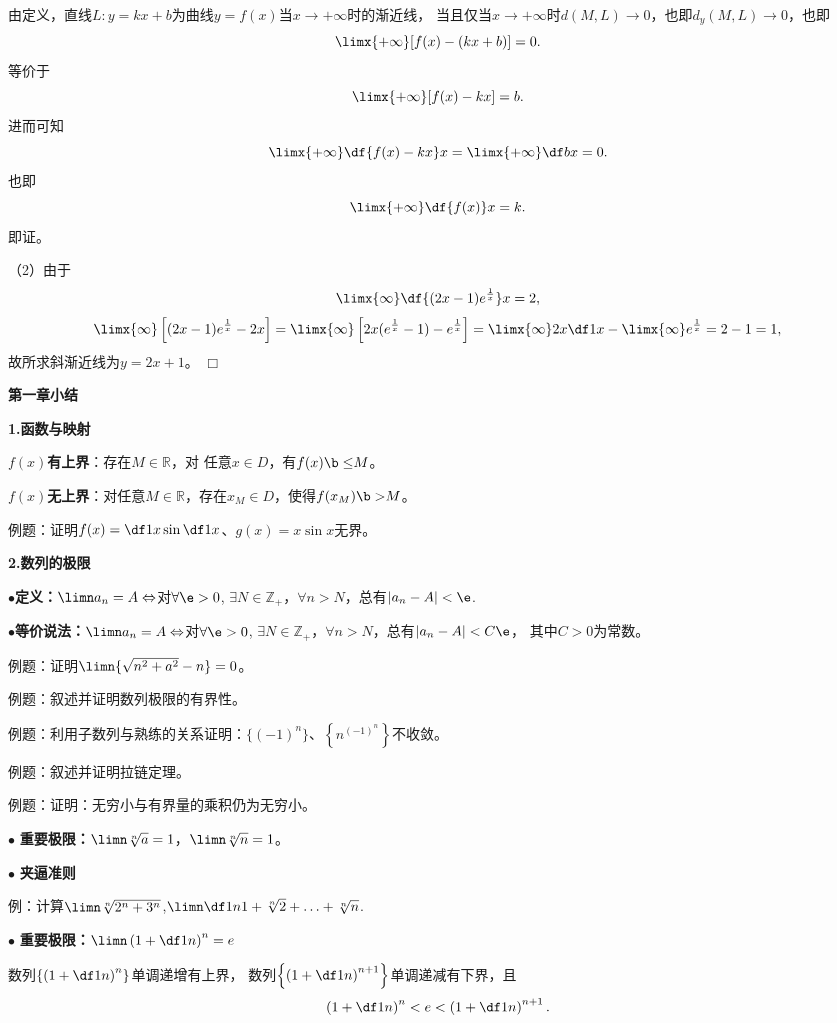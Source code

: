 由定义，直线$L:y=kx+b$为曲线$y=f(x)$当$x\to+\infty$时的渐近线，
当且仅当$x\to+\infty$时$d(M,L)\to 0$，也即$d_y(M,L)\to 0$，也即
$$\limx{+\infty}[f(x)-(kx+b)]=0.$$
等价于
$$\limx{+\infty}[f(x)-kx]=b.$$
进而可知
$$\limx{+\infty}\df{f(x)-kx}x=\limx{+\infty}\df bx=0.$$
也即
$$\limx{+\infty}\df{f(x)}x=k.$$
即证。

（2）由于
$$\limx{\infty}\df{(2x-1)e^{\frac1x}}x=2,$$
$$\limx{\infty}\left[(2x-1)e^{\frac1x}-2x\right]
=\limx{\infty}\left[2x(e^{\frac1x}-1)-e^{\frac1x}\right]
=\limx{\infty}2x\df1x-\limx{\infty}e^{\frac1x}=2-1=1,$$
故所求斜渐近线为$y=2x+1$。
\hfill$\Box$

\newpage

\begin{center}
	\Large\bf 第一章小结
\end{center}

{\bf 1.函数与映射}

{\bf $f(x)$有上界}：存在$M\in\mathbb{R}$，对
任意$x\in D$，有$f(x){\b \leq} M$。

{\bf $f(x)$无上界}：对任意$M\in\mathbb{R}$，存在$x_M\in
D$，使得$f(x_M){\b >}M$。

例题：证明$f(x)=\df1x\sin\df1x$、$g(x)=x\sin x$无界。

{\bf 2.数列的极限}

$\bullet${\bf 定义：}$\limn a_n=A\Leftrightarrow$对$\forall\e>0$,
$\exists N\in\mathbb{Z}_+$，$\forall n>N$，总有$|a_n-A|<\e$.

$\bullet${\bf 等价说法：}$\limn a_n=A\Leftrightarrow$对$\forall\e>0$,
$\exists N\in\mathbb{Z}_+$，$\forall n>N$，总有$|a_n-A|<C\e$，
其中$C>0$为常数。

例题：证明$\limn{\sqrt{n^2+a^2}-n}=0$。

例题：叙述并证明数列极限的有界性。

例题：利用子数列与熟练的关系证明：$\{(-1)^n\}$、$\left\{n^{(-1)^n}\right\}$不收敛。

例题：叙述并证明拉链定理。

例题：证明：无穷小与有界量的乘积仍为无穷小。

$\bullet$ {\bf 重要极限：}$\limn\sqrt[n]a=1$，$\limn\sqrt[n]n=1$。

$\bullet$ {\bf 夹逼准则}

例：计算$\limn\sqrt[n]{2^n+3^n}$,$\limn\df1n{1+\sqrt[n]2+\ldots+\sqrt[n]n}$.

$\bullet$ {\bf 重要极限：}$\limn\left(1+\df1n\right)^n=e$

数列$\left\{\left(1+\df1n\right)^n\right\}$单调递增有上界，
数列$\left\{\left(1+\df1n\right)^{n+1}\right\}$单调递减有下界，且
$$\left(1+\df1n\right)^n<e<\left(1+\df1n\right)^{n+1}.$$

